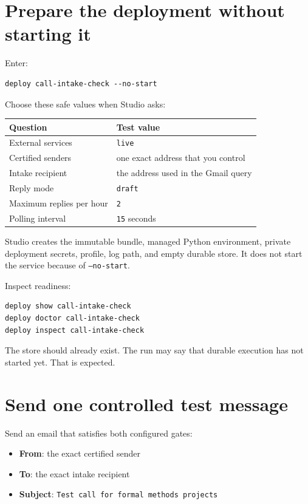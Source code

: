 \documentclass[11pt,a4paper]{article}
\begin{document}
\section{Prepare the deployment without starting it}

Enter:

\begin{lstlisting}[style=shell]
deploy call-intake-check --no-start
\end{lstlisting}

Choose these safe values when Studio asks:

\begin{center}
\begin{tabularx}{0.94\linewidth}{@{}l X@{}}
\toprule
Question & Test value \\
\midrule
External services & \texttt{live} \\
Certified senders & one exact address that you control \\
Intake recipient & the address used in the Gmail query \\
Reply mode & \texttt{draft} \\
Maximum replies per hour & \texttt{2} \\
Polling interval & \texttt{15} seconds \\
\bottomrule
\end{tabularx}
\end{center}

Studio creates the immutable bundle, managed Python environment, private
deployment secrets, profile, log path, and empty durable store. It does not
start the service because of \texttt{--no-start}.

Inspect readiness:

\begin{lstlisting}[style=shell]
deploy show call-intake-check
deploy doctor call-intake-check
deploy inspect call-intake-check
\end{lstlisting}

The store should already exist. The run may say that durable execution has not
started yet. That is expected.

\section{Send one controlled test message}

Send an email that satisfies both configured gates:

\begin{itemize}
  \item \textbf{From}: the exact certified sender
  \item \textbf{To}: the exact intake recipient
  \item \textbf{Subject}: \texttt{Test call for formal methods projects}
\end{itemize}
\end{document}
